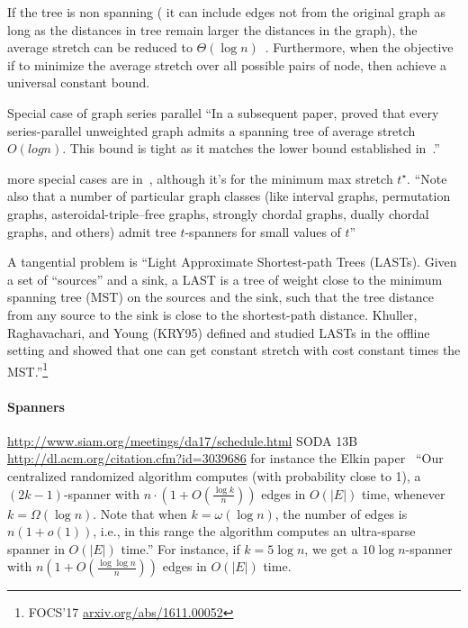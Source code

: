 If the tree is non spanning (\ie{} it can include edges not from the original graph as long as the
distances in tree remain larger the distances in the graph), the average stretch can be reduced to
$\Theta(\log n)$~\autocite{lognMetricBoundConf03}. Furthermore, when the objective if to minimize
the average stretch over all possible pairs of node, then \textcite{constantDistortion07} achieve a
universal constant bound.

Special case of graph
series parallel
\enquote{In a subsequent paper, \textcite{seriesParallel06} proved that every series-parallel
unweighted graph admits a spanning tree of average stretch $O(log n)$. This bound is tight as it
matches the lower bound established in~\autocite{cutsTrees99}.}

more special cases are in~\autocite{specialCase14}, although it's for the minimum max stretch
$t^\star$.
\enquote{Note also that a number of particular graph classes (like interval
graphs, permutation graphs, asteroidal-triple–free graphs, strongly chordal graphs,
dually chordal graphs, and others) admit tree $t$-spanners for small values of $t$}

A tangential problem is \enquote{Light Approximate Shortest-path Trees (LASTs).  Given a set of
“sources” and a sink, a LAST is a tree of weight close to the minimum spanning tree (MST) on the
sources and the sink, such that the tree distance from any source to the sink is close to the
shortest-path distance. Khuller, Raghavachari, and Young (KRY95) defined and studied LASTs in the
offline setting and showed that one can get constant stretch with cost constant times the
MST.}\footnote{FOCS'17 \href{https://arxiv.org/abs/1611.00052}{arxiv.org/abs/1611.00052}}

\paragraph{Spanners}
\label{par:spanners}

\url{http://www.siam.org/meetings/da17/schedule.html} SODA 13B \url{http://dl.acm.org/citation.cfm?id=3039686}
for instance the Elkin paper~\autocite{Spanner17} \enquote{Our centralized randomized algorithm computes (with
probability close to 1), a $(2k - 1)$-spanner with $n \cdot (1 + O(\frac{\log k}{n}))$ edges in
$O(|E|)$ time, whenever $k = \Omega(\log n)$. Note that when $k = \omega(\log n)$, the number of
edges is $n(1+o(1))$, i.e., in this range the algorithm computes an ultra-sparse spanner in $O(|E|)$
time.} For instance, if $k=5\log n$, we get a $10\log n$-spanner with $n\left(1+O\left(\frac{\log\log
n}{n}\right)\right)$ edges in $O(|E|)$ time.

